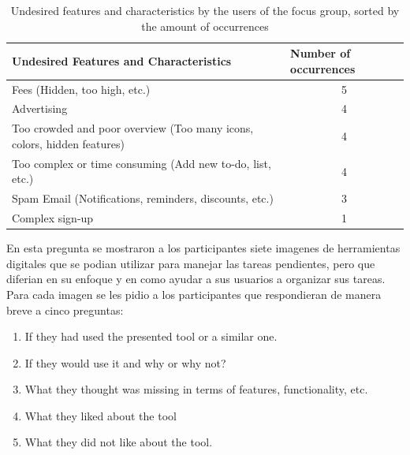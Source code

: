 \FloatBarrier
\begin{table}[!htbp]
    \centering
    \begin{adjustbox}{width=1.2\textwidth,center=\textwidth}
    \begin{tabular}{|l|l|}
        \hline
        \textbf{Undesired Features and Characteristics}                          & \textbf{Number of occurrences} \\ \hline
        Fees (Hidden, too high, etc.)                                            & \multicolumn{1}{c|}{5} \\ \hline
        Advertising                                                              & \multicolumn{1}{c|}{4} \\ \hline
        Too crowded and poor overview (Too many icons, colors, hidden features)  & \multicolumn{1}{c|}{4} \\ \hline
        Too complex or time consuming (Add new to-do, list, etc.)                & \multicolumn{1}{c|}{4} \\ \hline
        Spam Email (Notifications, reminders, discounts, etc.)                   & \multicolumn{1}{c|}{3} \\ \hline
        Complex sign-up                                                          & \multicolumn{1}{c|}{1} \\ \hline
    \end{tabular}
    \end{adjustbox}
    \caption{Undesired features and characteristics by the users of the focus group, sorted by the amount of occurrences}
    \label{tab:badFeaturesTable}
\end{table}
\FloatBarrier

En esta pregunta se mostraron a los participantes siete imagenes de herramientas digitales que se podian utilizar para manejar las tareas pendientes, pero que diferian en su enfoque y en como ayudar a sus usuarios a organizar sus tareas. Para cada imagen se les pidio a los participantes que respondieran de manera breve a cinco preguntas:

\begin{enumerate}
    \item If they had used the presented tool or a similar one.
    \item If they would use it and why or why not?
    \item What they thought was missing in terms of features, functionality, etc.
    \item What they liked about the tool
    \item What they did not like about the tool.
\end{enumerate}


